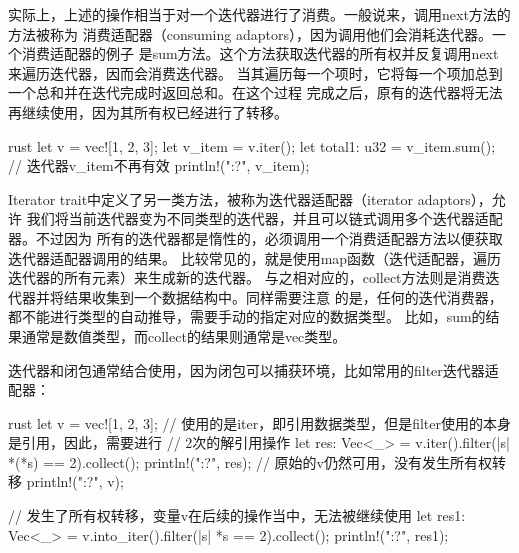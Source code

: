 实际上，上述的操作相当于对一个迭代器进行了消费。一般说来，调用next方法的方法被称为
消费适配器（consuming adaptors），因为调用他们会消耗迭代器。一个消费适配器的例子
是sum方法。这个方法获取迭代器的所有权并反复调用next来遍历迭代器，因而会消费迭代器。
当其遍历每一个项时，它将每一个项加总到一个总和并在迭代完成时返回总和。在这个过程
完成之后，原有的迭代器将无法再继续使用，因为其所有权已经进行了转移。
\begin{code-block}{rust}
let v = vec![1, 2, 3];
let v_item = v.iter();
let total1: u32 = v_item.sum();
// 迭代器v_item不再有效
println!("{:?}", v_item);
\end{code-block}

Iterator trait中定义了另一类方法，被称为迭代器适配器（iterator adaptors），允许
我们将当前迭代器变为不同类型的迭代器，并且可以链式调用多个迭代器适配器。不过因为
所有的迭代器都是惰性的，必须调用一个消费适配器方法以便获取迭代器适配器调用的结果。
比较常见的，就是使用map函数（迭代适配器，遍历迭代器的所有元素）来生成新的迭代器。
与之相对应的，collect方法则是消费迭代器并将结果收集到一个数据结构中。同样需要注意
的是，任何的迭代消费器，都不能进行类型的自动推导，需要手动的指定对应的数据类型。
比如，sum的结果通常是数值类型，而collect的结果则通常是vec类型。

迭代器和闭包通常结合使用，因为闭包可以捕获环境，比如常用的filter迭代器适配器：
\begin{code-block}{rust}
let v = vec![1, 2, 3];
// 使用的是iter，即引用数据类型，但是filter使用的本身是引用，因此，需要进行
// 2次的解引用操作
let res: Vec<_> = v.iter().filter(|s| *(*s) == 2).collect();
println!("{:?}", res);
// 原始的v仍然可用，没有发生所有权转移
println!("{:?}", v);

// 发生了所有权转移，变量v在后续的操作当中，无法被继续使用
let res1: Vec<_> = v.into_iter().filter(|s| *s == 2).collect();
println!("{:?}", res1);
\end{code-block}

